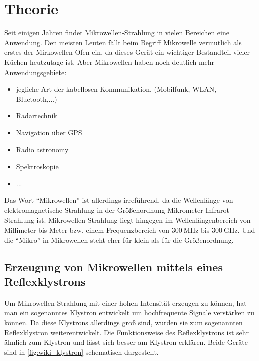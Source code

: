 \section{Theorie}
\label{sec:Theorie}

Seit einigen Jahren findet Mikrowellen-Strahlung in vielen Bereichen eine Anwendung. 
Den meisten Leuten fällt beim Begriff Mikrowelle vermutlich als erstes der Mirkowellen-Ofen ein,
da dieses Gerät ein wichtiger Bestandteil vieler Küchen heutzutage ist.
Aber Mikrowellen haben noch deutlich mehr Anwendungsgebiete:
\begin{itemize}
    \item jegliche Art der kabellosen Kommunikation. (Mobilfunk, WLAN, Bluetooth,...)
    \item Radartechnik
    \item Navigation über GPS
    \item Radio astronomy
    \item Spektroskopie
    \item ...
\end{itemize}

Das Wort \enquote{Mikrowellen} ist allerdings irreführend, da die Wellenlänge von elektromagnetische Strahlung in der Größenordnung Mikrometer 
Infrarot-Strahlung ist.
Mikrowellen-Strahlung liegt hingegen im Wellenlängenbereich von Millimeter bis Meter bzw. einem Frequenzbereich von $\SI{300}{\mega\hertz}$ bis $\SI{300}{\giga\hertz}$.
Und die \enquote{Mikro} in Mikrowellen steht eher für klein als für die Größenordnung.

\subsection{Erzeugung von Mikrowellen mittels eines Reflexklystrons}
\label{ssec:Erzeugung}

Um Mikrowellen-Strahlung mit einer hohen Intensität erzeugen zu können, hat man ein sogenanntes Klystron entwickelt um hochfrequente Signale verstärken zu können.
Da diese Klystrons allerdings groß sind, wurden sie zum sogenannten Reflexklystron weiterentwickelt.
Die Funktionsweise des Reflexklystrons ist sehr ähnlich zum Klystron und lässt sich besser am Klystron erklären.
Beide Geräte sind in \autoref{fig:wiki_klystron} schematisch dargestellt.

